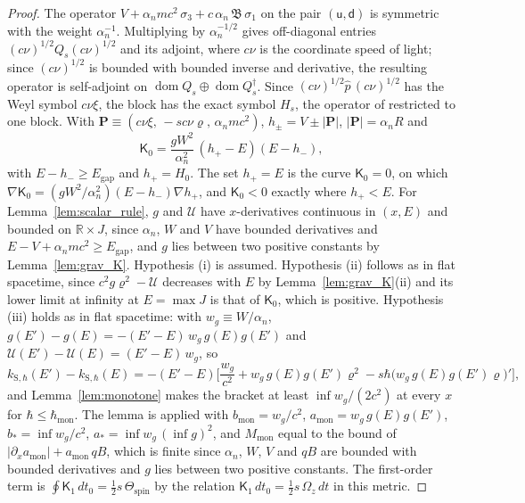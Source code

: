 \documentclass[aps,prd,onecolumn,tightenlines,nofootinbib,notitlepage,11pt,floatfix]{revtex4-2}
\theoremstyle{indentedtheorem}
\begin{document}
\begin{proof}
The operator $V+\alpha_nmc^2\,\sigma_3+c\,\alpha_n\,\mathfrak{B}\,\sigma_1$ on the pair $(\mathsf{u},\mathsf{d})$ is symmetric with the weight $\alpha_n^{-1}$. Multiplying by $\alpha_n^{-1/2}$ gives off-diagonal entries $(c\nu)^{1/2}Q_s(c\nu)^{1/2}$ and its adjoint, where $c\nu$ is the coordinate speed of light; since $(c\nu)^{1/2}$ is bounded with bounded inverse and derivative, the resulting operator is self-adjoint on $\operatorname{dom}Q_s\oplus\operatorname{dom}Q_s^\dagger$. Since $(c\nu)^{1/2}\hat{p}\,(c\nu)^{1/2}$ has the Weyl symbol $c\nu\xi$, the block has the exact symbol $H_s$, the operator of \citet{ObukhovSilenkoTeryaev2011Dirac} restricted to one block. With $\mathbf{P}\equiv(c\nu\xi,\,-sc\nu\varrho,\,\alpha_nmc^2)$, $h_\pm=V\pm|\mathbf{P}|$, $|\mathbf{P}|=\alpha_nR$ and
\begin{equation*}
    \mathsf{K}_0 = \frac{gW^2}{\alpha_n^2}\,(h_+-E)(E-h_-) ,
\end{equation*}
with $E-h_-\geq E_\text{gap}$ and $h_+=H_0$. The set $h_+=E$ is the curve $\mathsf{K}_0=0$, on which $\nabla\mathsf{K}_0=(gW^2/\alpha_n^2)(E-h_-)\nabla h_+$, and $\mathsf{K}_0<0$ exactly where $h_+<E$. For Lemma~\ref{lem:scalar_rule}, $g$ and $\mathcal{U}$ have $x$-derivatives continuous in $(x,E)$ and bounded on $\mathbb{R}\times J$, since $\alpha_n$, $W$ and $V$ have bounded derivatives and $E-V+\alpha_nmc^2\geq E_\text{gap}$, and $g$ lies between two positive constants by Lemma~\ref{lem:grav_K}. Hypothesis (i) is assumed. Hypothesis (ii) follows as in flat spacetime, since $c^2g\varrho^2-\mathcal{U}$ decreases with $E$ by Lemma~\ref{lem:grav_K}(ii) and its lower limit at infinity at $E=\max J$ is that of $\mathsf{K}_0$, which is positive. Hypothesis (iii) holds as in flat spacetime: with $w_g\equiv W/\alpha_n$, $g(E')-g(E)=-(E'-E)\,w_g\,g(E)g(E')$ and $\mathcal{U}(E')-\mathcal{U}(E)=(E'-E)\,w_g$, so
\begin{equation*}
    k_{\text{S},\hbar}(E')-k_{\text{S},\hbar}(E) = -(E'-E)\Big[\frac{w_g}{c^2}+w_g\,g(E)g(E')\varrho^2-s\hbar\big(w_g\,g(E)g(E')\varrho\big)'\Big] ,
\end{equation*}
and Lemma~\ref{lem:monotone} makes the bracket at least $\inf w_g/(2c^2)$ at every $x$ for $\hbar\leq\hbar_\text{mon}$. The lemma is applied with $b_\text{mon}=w_g/c^2$, $a_\text{mon}=w_g\,g(E)g(E')$, $b_*=\inf w_g/c^2$, $a_*=\inf w_g\,(\inf g)^2$, and $M_\text{mon}$ equal to the bound of $|\partial_xa_\text{mon}|+a_\text{mon}\,qB$, which is finite since $\alpha_n$, $W$, $V$ and $qB$ are bounded with bounded derivatives and $g$ lies between two positive constants. The first-order term is $\oint\mathsf{K}_1\,dt_0=\tfrac{1}{2}s\,\Theta_\text{spin}$ by the relation $\mathsf{K}_1\,dt_0=\tfrac{1}{2}s\,\Omega_z\,dt$ in this metric.
\end{proof}
\end{document}
